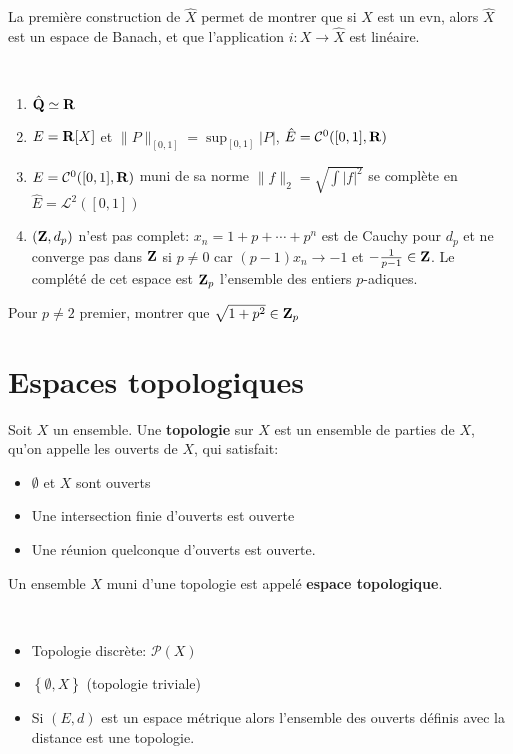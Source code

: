 \begin{rem}
La première construction de $\hat{X}$ permet de montrer que si $X$ est un evn, alors $\hat{X}$ est un espace de Banach, et que l'application $i: X \rightarrow \hat{X}$ est linéaire.
\end{rem}

\begin{ex}~
\begin{enumerate}
    \item $ \hat{\mathbf Q}\simeq\mathbf R$
    \item $E=\mathbf R[X]$ et $\|P\|_{[0,1]}=\sup_{[0,1]} |P|$, $ \hat{E}=\mathcal C^0([0, 1], \mathbf R)$
    \item $E=\mathcal  C^0([0, 1], \mathbf R)$ muni de sa norme $\|f\|_2=\sqrt{\int |f|^2 }$ se complète en $ \hat{E}=\mathcal  L^2([0, 1])$
    \item $(\mathbf Z, d_p)$ n'est pas complet: $x_n=1+p+\cdots +p^n$ est de Cauchy pour $d_p$ et ne converge pas dans  $\mathbf Z$ si $p\neq 0$ car  $(p-1)x_n \longrightarrow -1$ et $-\frac{1}{p-1} \in \mathbf Z$. Le complété de cet espace est $\mathbf Z_p$ l'ensemble des entiers $p$-adiques.
\end{enumerate}
\end{ex}

\begin{exo}
Pour $p\neq 2$ premier, montrer que  $ \sqrt{1+p^2 } \in  \mathbf Z_p $
\end{exo}

\section{Espaces topologiques}

\begin{dfn}
    Soit $X$ un ensemble. Une \textbf{topologie}  sur  $X$ est un ensemble de parties de  $X$, qu'on appelle les ouverts de  $X$, qui satisfait: \begin{itemize}
        \item $\emptyset$ et  $X$ sont ouverts
        \item Une intersection finie d'ouverts est ouverte
        \item Une réunion quelconque d'ouverts est ouverte.
    \end{itemize}
    Un ensemble $X$ muni d'une topologie est appelé \textbf{espace topologique}.
\end{dfn}

\begin{ex}~
\begin{itemize}
    \item Topologie discrète: $ \mathcal P(X)$
    \item $ \left\{ \emptyset, X \right\} $ (topologie triviale)
    \item Si $(E, d)$ est un espace métrique alors l'ensemble des ouverts définis avec la distance est une topologie.
\end{itemize}
\end{ex}

